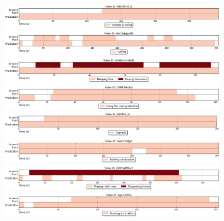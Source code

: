 \begin{figure}[H]
\begin{center}
\includegraphics[width=1\linewidth]{img/results/activity_detection/activity_temporal_localization_12}
\includegraphics[width=1\linewidth]{img/results/activity_detection/activity_temporal_localization_13}
\includegraphics[width=1\linewidth]{img/results/activity_detection/activity_temporal_localization_14}
\includegraphics[width=1\linewidth]{img/results/activity_detection/activity_temporal_localization_15}
\includegraphics[width=1\linewidth]{img/results/activity_detection/activity_temporal_localization_16}
\includegraphics[width=1\linewidth]{img/results/activity_detection/activity_temporal_localization_17}
\includegraphics[width=1\linewidth]{img/results/activity_detection/activity_temporal_localization_18}
\includegraphics[width=1\linewidth]{img/results/activity_detection/activity_temporal_localization_19}

\end{center}
\end{figure}
